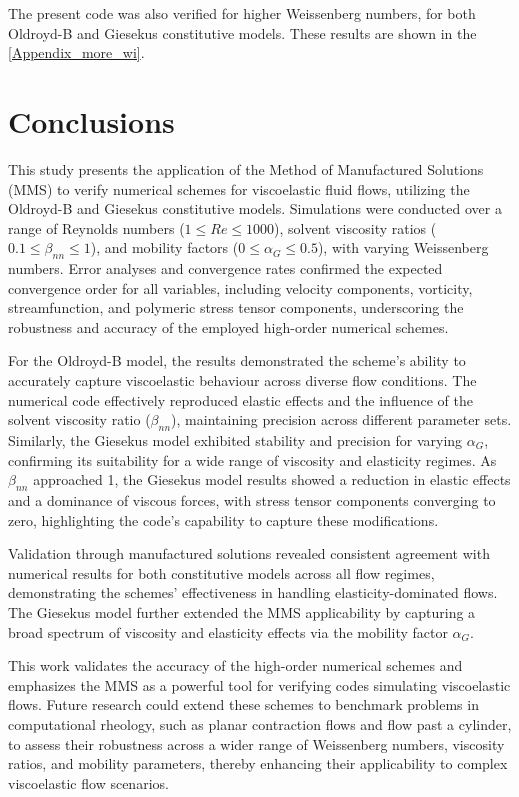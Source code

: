 \documentclass[preprint, 12pt]{elsarticle}
\begin{document}
{\color{red} The present code was also verified for higher Weissenberg numbers, for both
Oldroyd-B and Giesekus constitutive models. These results are shown in the \ref{Appendix_more_wi}.}


\section{Conclusions}\label{sec_Conclusions}

{\color{red} This study presents the application of the Method of Manufactured Solutions
(MMS) to verify numerical schemes for viscoelastic fluid flows, utilizing the
Oldroyd-B and Giesekus constitutive models. Simulations were conducted over a
range of Reynolds numbers (\( 1 \leq Re \leq 1000 \)), solvent viscosity ratios
(\( 0.1 \leq \beta_{nn} \leq 1 \)), and mobility factors (\( 0 \leq \alpha_G
\leq 0.5 \)), with varying Weissenberg numbers. Error analyses and convergence
rates confirmed the expected convergence order for all variables, including
velocity components, vorticity, streamfunction, and polymeric stress tensor
components, underscoring the robustness and accuracy of the employed high-order
numerical schemes.

For the Oldroyd-B model, the results demonstrated the scheme's ability to
accurately capture viscoelastic behaviour across diverse flow conditions. The
numerical code effectively reproduced elastic effects and the influence of the
solvent viscosity ratio (\( \beta_{nn} \)), maintaining precision across
different parameter sets. Similarly, the Giesekus model exhibited stability and
precision for varying \( \alpha_G \), confirming its suitability for a wide
range of viscosity and elasticity regimes. As \( \beta_{nn} \) approached 1,
the Giesekus model results showed a reduction in elastic effects and a
dominance of viscous forces, with stress tensor components converging to zero,
highlighting the code’s capability to capture these modifications.

Validation through manufactured solutions revealed consistent agreement with
numerical results for both constitutive models across all flow regimes,
demonstrating the schemes' effectiveness in handling elasticity-dominated
flows. The Giesekus model further extended the MMS applicability by capturing a
broad spectrum of viscosity and elasticity effects via the mobility factor \(
\alpha_G \).

This work validates the accuracy of the high-order numerical schemes and
emphasizes the MMS as a powerful tool for verifying codes simulating
viscoelastic flows. Future research could extend these schemes to benchmark
problems in computational rheology, such as planar contraction flows and flow
past a cylinder, to assess their robustness across a wider range of Weissenberg
numbers, viscosity ratios, and mobility parameters, thereby enhancing their
applicability to complex viscoelastic flow scenarios.}
\end{document}
